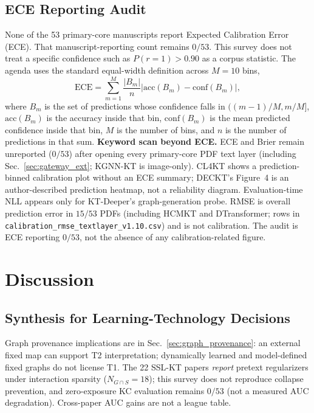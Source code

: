 \documentclass[lettersize,journal]{IEEEtran}
\begin{document}
\subsection{ECE Reporting Audit}
None of the 53 primary-core manuscripts report Expected Calibration Error (ECE). That manuscript-reporting count remains $0/53$. This survey does not treat a specific confidence such as $P(r=1)>0.90$ as a corpus statistic. The agenda uses the standard equal-width definition across $M=10$ bins,
\begin{equation}
\text{ECE} = \sum_{m=1}^{M} \frac{|B_m|}{n} \left| \text{acc}(B_m) - \text{conf}(B_m) \right|,
\end{equation}
where $B_m$ is the set of predictions whose confidence falls in $((m-1)/M, m/M]$, $\mathrm{acc}(B_m)$ is the accuracy inside that bin, $\mathrm{conf}(B_m)$ is the mean predicted confidence inside that bin, $M$ is the number of bins, and $n$ is the number of predictions in that sum.
\textbf{Keyword scan beyond ECE.} ECE and Brier remain unreported ($0/53$) after opening every primary-core PDF text layer (including Sec.~\ref{sec:gateway_ext}; KGNN-KT is image-only). CL4KT shows a prediction-binned calibration plot without an ECE summary; DECKT's Figure~4 is an author-described prediction heatmap, not a reliability diagram. Evaluation-time NLL appears only for KT-Deeper's graph-generation probe. RMSE is overall prediction error in $15/53$ PDFs (including HCMKT and DTransformer; rows in \texttt{calibration\_rmse\_textlayer\_v1.10.csv}) and is not calibration. The audit is ECE reporting $0/53$, not the absence of any calibration-related figure.

\section{Discussion}
\label{sec:discussion}

\subsection{Synthesis for Learning-Technology Decisions}
Graph provenance implications are in Sec.~\ref{sec:graph_provenance}: an external fixed map can support T2 interpretation; dynamically learned and model-defined fixed graphs do not license T1. The 22 SSL-KT papers \emph{report} pretext regularizers under interaction sparsity ($N_{G\cap S}=18$); this survey does not reproduce collapse prevention, and zero-exposure KC evaluation remains $0/53$ (not a measured AUC degradation). Cross-paper AUC gains are not a league table.
\end{document}
